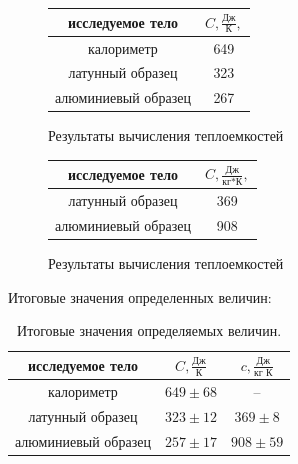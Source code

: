 \documentclass[a4paper, 12pt]{article}%
\begin{document}
	\begin{figure}[H]
		\begin{center}
			\begin{minipage}[h]{0.48\linewidth}
				\centering
				\begin{tabular}{|c|c|}
					\hline
					исследуемое тело                 & $C, \frac{\text{Дж}}{\text{К}}, $  \\ \hline
					калориметр                       & 649 \\ \hline	
					латунный образец   				 & 323 \\ \hline
					алюминиевый образец 			 & 267 \\ \hline
				\end{tabular}
				\caption{Результаты вычисления теплоемкостей}
			\end{minipage}
			\hfill
			\begin{minipage}[h]{0.48\linewidth}
				\centering
				\begin{tabular}{|c|c|}
					\hline
					исследуемое тело                 & $C, \frac{\text{Дж}}{\text{кг*К}}, $  \\ \hline
					латунный образец   				 & 369 \\ \hline
					алюминиевый образец 			 & 908 \\ \hline
				\end{tabular}
				\caption{Результаты вычисления теплоемкостей}
			\end{minipage}
			
		\end{center}
	\end{figure}
	\begin{table}[h!]
		
		\label{tab:second_results_for_capacity}
	\end{table}

	\begin{table}[H]
		

	\end{table}
	\begin{center}
		Итоговые значения определенных величин:
	\end{center}
	
	\begin{table}[H]
		\centering
		\begin{tabular}{|c|c|c|}
			\hline
			исследуемое тело & $C, \frac{\text{Дж}}{\text{К}}$ & $c, \frac{\text{Дж}}{\text{кг К}}$ \\ \hline
			калориметр          & $649 \pm 68 $ & --            \\ \hline
			латунный образец    & $323 \pm 12 $ & $369 \pm 8 $  \\ \hline
			алюминиевый образец & $257 \pm 17 $ & $908 \pm 59 $ \\ \hline
		\end{tabular}
		\caption{Итоговые значения определяемых величин.}
	\end{table}
\end{document}
